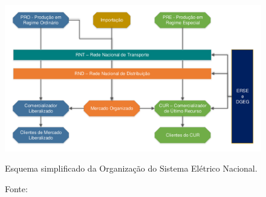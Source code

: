 \begin{figure}[H]
	\centering
	\captionsetup{width=\textwidth, font=footnotesize, textfont=bf}	
	\includegraphics[width=\textwidth]{img/Organizacao_SEP_PT.pdf}
	\caption{Esquema simplificado da Organização do Sistema Elétrico Nacional.}
	\vspace{-3.5mm}
	\caption*{Fonte: \cite{gil2010analise}}
	\label{fig:Organizacao_SEP_PT}
\end{figure}